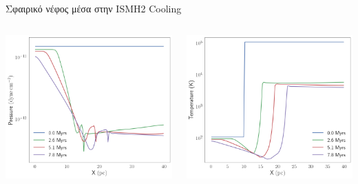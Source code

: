 \documentclass{beamer}
\begin{document}
\begin{frame}{Σφαιρικό νέφος μέσα στην ISM}{Η2 Cooling}
	\begin{columns}
		
		\begin{center}
			\includegraphics[width=1\linewidth]{../Document/DataImages/H2CoolingPRSprofile}
		\end{center}
\begin{center}
	\includegraphics[width=1\linewidth]{../Document/DataImages/H2CoolingTMPprofile}
\end{center}
	\end{columns}
\end{frame}
\end{document}
